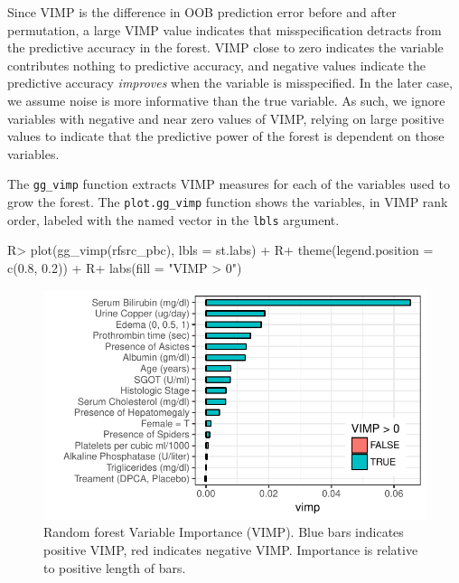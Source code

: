\documentclass[article]{jss}
\begin{document}
Since VIMP is the difference in OOB prediction error before and after
permutation, a large VIMP value indicates that misspecification detracts
from the predictive accuracy in the forest. VIMP close to zero indicates
the variable contributes nothing to predictive accuracy, and negative
values indicate the predictive accuracy \emph{improves} when the
variable is misspecified. In the later case, we assume noise is more
informative than the true variable. As such, we ignore variables with
negative and near zero values of VIMP, relying on large positive values
to indicate that the predictive power of the forest is dependent on
those variables.

The \texttt{gg\_vimp} function extracts VIMP measures for each of the
variables used to grow the forest. The \texttt{plot.gg\_vimp} function
shows the variables, in VIMP rank order, labeled with the named vector
in the \texttt{lbls} argument.

\begin{Schunk}
\begin{Sinput}
R> plot(gg_vimp(rfsrc_pbc), lbls = st.labs) +
R+   theme(legend.position = c(0.8, 0.2)) +
R+   labs(fill = "VIMP > 0")
\end{Sinput}
\begin{figure}[!htb]

{\centering \includegraphics{fig-rfs/rfs-rf-vimp-1} 

}

\caption[Random forest Variable Importance (VIMP)]{Random forest Variable Importance (VIMP). Blue bars indicates positive VIMP, red indicates negative VIMP. Importance is relative to positive length of bars.}\label{fig:rf-vimp}
\end{figure}
\end{Schunk}
\end{document}
